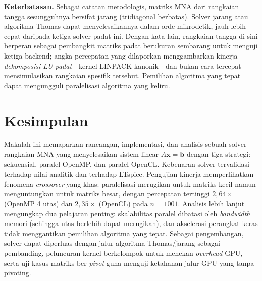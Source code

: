 \documentclass[conference]{IEEEtran}
\begin{document}
\textbf{Keterbatasan.} Sebagai catatan metodologis, matriks MNA dari rangkaian tangga sesungguhnya bersifat jarang (tridiagonal berbatas). Solver jarang atau algoritma Thomas dapat menyelesaikannya dalam orde mikrodetik, jauh lebih cepat daripada ketiga solver padat ini. Dengan kata lain, rangkaian tangga di sini berperan sebagai pembangkit matriks padat berukuran sembarang untuk menguji ketiga backend; angka percepatan yang dilaporkan menggambarkan kinerja \emph{dekomposisi LU padat}---kernel LINPACK kanonik---dan bukan cara tercepat mensimulasikan rangkaian spesifik tersebut. Pemilihan algoritma yang tepat dapat mengungguli paralelisasi algoritma yang keliru.

\section{Kesimpulan}
Makalah ini memaparkan rancangan, implementasi, dan analisis sebuah solver rangkaian MNA yang menyelesaikan sistem linear $A\mathbf{x}=\mathbf{b}$ dengan tiga strategi: sekuensial, paralel OpenMP, dan paralel OpenCL. Kebenaran solver tervalidasi terhadap nilai analitik dan terhadap LTspice. Pengujian kinerja memperlihatkan fenomena \emph{crossover} yang khas: paralelisasi merugikan untuk matriks kecil namun menguntungkan untuk matriks besar, dengan percepatan tertinggi $2{,}64\times$ (OpenMP 4 utas) dan $2{,}35\times$ (OpenCL) pada $n=1001$. Analisis lebih lanjut mengungkap dua pelajaran penting: skalabilitas paralel dibatasi oleh \emph{bandwidth} memori (sehingga utas berlebih dapat merugikan), dan akselerasi perangkat keras tidak menggantikan pemilihan algoritma yang tepat. Sebagai pengembangan, solver dapat diperluas dengan jalur algoritma Thomas/jarang sebagai pembanding, peluncuran kernel berkelompok untuk menekan \emph{overhead} GPU, serta uji kasus matriks ber-\emph{pivot} guna menguji ketahanan jalur GPU yang tanpa pivoting.
\end{document}
